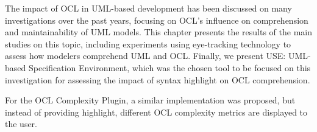 The impact of OCL in UML-based development has been discussed on many investigations over the past years, focusing on OCL's influence on comprehension and maintainability of UML models. This chapter presents the results of the main studies on this topic, including experiments using eye-tracking technology to assess how modelers comprehend UML and OCL. Finally, we present USE: UML-based Specification Environment, which was the chosen tool to be focused on this investigation for assessing the impact of syntax highlight on OCL comprehension.





\begin{comment}
Besides aiming at shedding some light on the factors that influence the OCL learning process, we propose a tool-based learning feature, dubbed "model highlighting", reified as a plugin to Bremen's USE tool. This plugin highlights how an OCL clause traverses a UML class diagram. We performed a preliminary validation of this model highlighting feature by combining an action-research observation period on more than two hundred students in lab sessions in the current school year, with semi-structured interviews, whose conclusions were consolidated by a focus group. The panel of experts unanimously recognized that this model highlighting feature had a positive effect in the OCL learning process.
\end{comment}

\begin{comment}
 To achieve this, we propose a plugin developed in Java for an existing OCL tool named USE (UML-based Specification Environment)~\cite{use}.
 
The primary objective of this dissertation is to reduce cognitive and physiological effort, measured by the number of saccades and fixations captured by an eye-tracking device, needed to correctly interpret an OCL expression. Additionally, we aim to reduce the time needed to develop an OCL query, based on requirements documented in natural language, in the context of a UML diagram. In order to achieve these objectives, we developed a plugin in Java for an existing OCL tool named USE (UML-based Specification Environment)~\cite{use}.
\end{comment}



For the OCL Complexity Plugin, a similar implementation was proposed, but instead of providing highlight, different OCL complexity metrics are displayed to the user.




